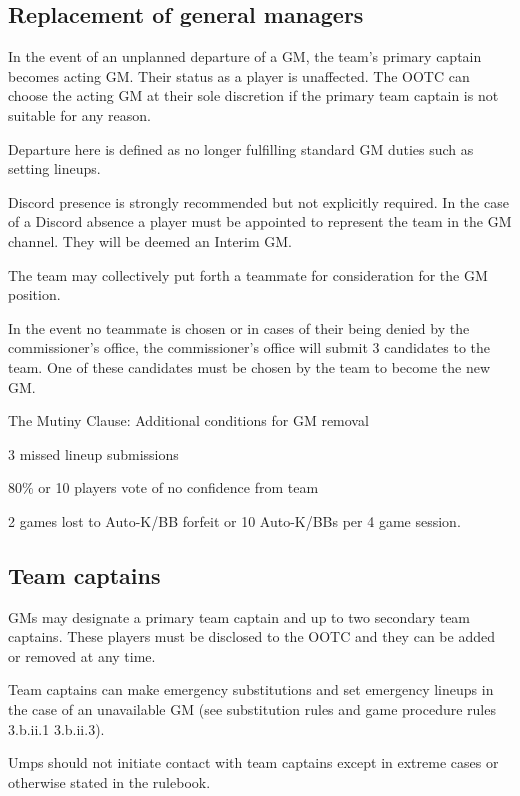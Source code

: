 \subsection{Replacement of general managers}
\begin{deepEnumerate}
	\item In the event of an unplanned departure of a GM,
	the team's primary captain becomes acting GM.
	Their status as a player is unaffected.
	The OOTC can choose the acting GM at their sole discretion
	if the primary team captain is not suitable for any reason.
	\begin{deepEnumerate}
		\item Departure here is defined as no longer fulfilling standard GM duties
		such as setting lineups.
		\begin{deepEnumerate}
			\item Discord presence is strongly recommended but not explicitly required.
			In the case of a Discord absence a player must be appointed
			to represent the team in the GM channel.
			They will be deemed an Interim GM.
		\end{deepEnumerate}
	\end{deepEnumerate}
	\item The team may collectively put forth a teammate for consideration for the GM position.
	\item In the event no teammate is chosen 
	or in cases of their being denied by the commissioner’s office,
	the commissioner’s office will submit 3 candidates to the team.
	One of these candidates must be chosen by the team to become the new GM.
	\item The Mutiny Clause: Additional conditions for GM removal
	\begin{deepEnumerate}
		\item 3 missed lineup submissions
		\item 80\% or 10 players vote of no confidence from team
		\item 2 games lost to Auto-K/BB forfeit or 10 Auto-K/BBs per 4 game session.
	\end{deepEnumerate}
\end{deepEnumerate}

\subsection{Team captains}
\begin{deepEnumerate}
	\item GMs may designate a primary team captain and up to two secondary team captains.
	These players must be disclosed to the OOTC and they can be added or removed at any time.
	\item Team captains can make emergency substitutions and set emergency lineups
	in the case of an unavailable GM
	(see substitution rules and game procedure rules 3.b.ii.1 3.b.ii.3). %
	\begin{deepEnumerate}
		\item Umps should not initiate contact with team captains
		except in extreme cases or otherwise stated in the rulebook.
	\end{deepEnumerate}
\end{deepEnumerate}
